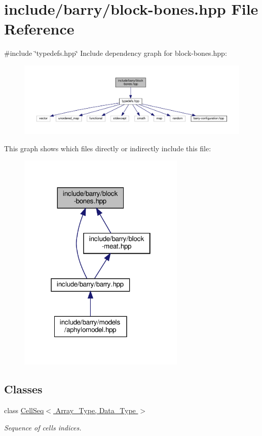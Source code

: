 \hypertarget{block-bones_8hpp}{}\section{include/barry/block-\/bones.hpp File Reference}
\label{block-bones_8hpp}
{\ttfamily \#include \char`\"{}typedefs.\+hpp\char`\"{}}\newline
Include dependency graph for block-\/bones.hpp\+:
\nopagebreak
\begin{figure}[H]
\begin{center}
\leavevmode
\includegraphics[width=350pt]{block-bones_8hpp__incl}
\end{center}
\end{figure}
This graph shows which files directly or indirectly include this file\+:
\nopagebreak
\begin{figure}[H]
\begin{center}
\leavevmode
\includegraphics[width=226pt]{block-bones_8hpp__dep__incl}
\end{center}
\end{figure}
\subsection*{Classes}
\begin{DoxyCompactItemize}
\item 
class \hyperlink{class_cell_seq}{Cell\+Seq$<$ Array\+\_\+\+Type, Data\+\_\+\+Type $>$}
\begin{DoxyCompactList}\small\item\em Sequence of cells indices. \end{DoxyCompactList}\end{DoxyCompactItemize}
